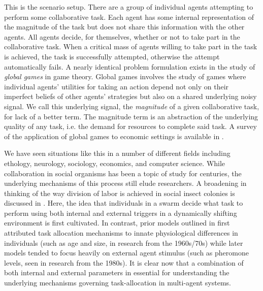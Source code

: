 \documentclass{nature}
\begin{document}
This is the scenario setup. There are a group of individual agents attempting to perform some collaborative task. Each agent has some internal representation of the magnitude of the task but does not share this information with the other agents. All agents decide, for themselves, whether or not to take part in the collaborative task. When a critical mass of agents willing to take part in the task is achieved, the task is successfully attempted, otherwise the attempt automatically fails. A nearly identical problem formulation exists in the study of \emph{global games} \cite{Carlsson1993} in game theory. Global games involves the study of games where individual agents' utilities for taking an action depend not only on their imperfect beliefs of other agents' strategies but also on a shared underlying noisy signal. We call this underlying signal, the \emph{magnitude} of a given collaborative task, for lack of a better term. The magnitude term is an abstraction of the underlying quality of any task, i.e. the demand for resources to complete said task. A survey of the application of global games to economic settings is available in \cite{Morris2000}.

We have seen situations like this in a number of different fields including ethology, neurology, sociology, economics, and computer science. While collaboration in social organisms has been a topic of study for centuries, the underlying mechanisms of this process still elude researchers. A broadening in thinking of the way division of labor is achieved in social insect colonies is discussed in \cite{Gordon1996}. Here, the idea that individuals in a swarm decide what task to perform using both internal and external triggers in a dynamically shifting environment is first cultivated. In contrast, prior models outlined in \cite{Gordon1996} first attributed task allocation mechanisms to innate physiological differences in individuals (such as age and size, in research from the 1960s/70s) while later models tended to focus heavily on external agent stimulus (such as pheromone levels, seen in research from the 1980s). It is clear now that a combination of both internal and external parameters in essential for understanding the underlying mechanisms governing task-allocation in multi-agent systems. 
\end{document}

